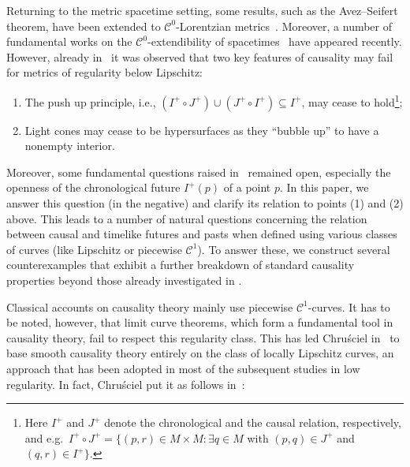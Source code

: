 \documentclass[reqno]{amsart}
\numberwithin{equation}{section}
\theoremstyle{plain}
\theoremstyle{definition}
\theoremstyle{remark}
\begin{document}
Returning to the metric spacetime setting, some results, such as the Avez--Seifert theorem,  
have been extended to $\mathcal{C}^0$-Lorentzian metrics~\cite{Sae:16}. Moreover, a number of fundamental 
works on the $\mathcal{C}^0$-extendibility of spacetimes~\cite{Sbi:18,Sbi:Proc,GLS:18} have appeared recently. However, already in~\cite{CG:12} it was observed that 
two key features of causality may fail for metrics of regularity below Lipschitz:
\begin{enumerate}
\item The push up principle, i.e., $\left( I^+\circ J^+ \right) \cup \left( J^+\circ I^+ \right) \subseteq I^+$, may cease 
to hold\footnote{Here $I^+$ and $J^+$ denote the 
chronological and the causal relation, respectively, and e.g.\ $I^+\circ J^+ =\{(p,r)\in M \times M: 
\exists q\in M$ with $(p,q)\in J^+$ and $(q,r)\in I^+ \}$.};  
\item Light cones may cease to be hypersurfaces as they ``bubble up'' to have 
a nonempty interior.
\end{enumerate}
Moreover, some fundamental questions raised in~\cite{CG:12} remained open, 
especially the openness of the chronological future $I^+(p)$ of a point $p$. In 
this paper, we answer this question (in the negative) and  clarify its
relation to points (1) and (2) above. This leads to a number of natural 
questions concerning the relation between causal and timelike futures and
pasts when defined using various classes of curves (like Lipschitz or piecewise $\mathcal{C}^1$).
To answer these, we construct several counterexamples that exhibit a further
breakdown of standard causality properties beyond those already investigated
in \cite{CG:12}.



Classical accounts on causality theory mainly use piecewise $\mathcal{C}^1$-curves. 
It has to be noted, however, that limit curve theorems, which form a 
fundamental tool in causality theory, fail to respect this regularity class. This has 
led Chru\'sciel in~\cite{Chr:11} to base smooth causality theory entirely on 
the class of locally Lipschitz curves, an approach that has been adopted in most 
of the subsequent studies in low regularity. In fact, Chru\'sciel put it as follows in~\cite[p.\ 14]{Chr:11}:\\
\end{document}

